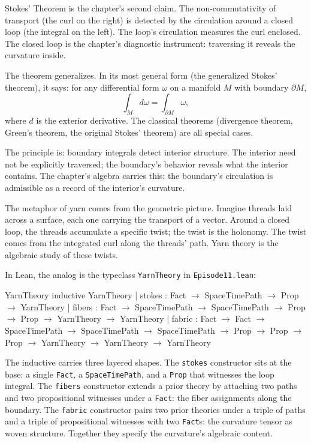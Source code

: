 Stokes' Theorem is the chapter's second claim. The non-commutativity
of transport (the curl on the right) is detected by the
circulation around a closed loop (the integral on the left). The
loop's circulation measures the curl enclosed. The closed loop is
the chapter's diagnostic instrument: traversing it reveals the
curvature inside.

The theorem generalizes. In its most general form (the generalized
Stokes' theorem), it says: for any differential form $\omega$
on a manifold $M$ with boundary $\partial M$,
\[
\int_M d\omega = \int_{\partial M} \omega,
\]
where $d$ is the exterior derivative. The classical theorems
(divergence theorem, Green's theorem, the original Stokes'
theorem) are all special cases.

The principle is: boundary integrals detect interior structure.
The interior need not be explicitly traversed; the boundary's
behavior reveals what the interior contains. The chapter's
algebra carries this: the boundary's circulation is admissible
as a record of the interior's curvature.

The metaphor of yarn comes from the geometric picture. Imagine
threads laid across a surface, each one carrying the transport
of a vector. Around a closed loop, the threads accumulate a
specific twist; the twist is the holonomy. The twist comes from
the integrated curl along the threads' path. Yarn theory is the
algebraic study of these twists.

In Lean, the analog is the typeclass \texttt{YarnTheory} in
\texttt{Episode11.lean}:

\begin{leanexcerpt}{YarnTheory}
inductive YarnTheory
  | stokes : Fact $\to$ SpaceTimePath $\to$ Prop $\to$ YarnTheory
  | fibers : Fact $\to$ SpaceTimePath $\to$ SpaceTimePath
           $\to$ Prop $\to$ Prop $\to$ YarnTheory $\to$ YarnTheory
  | fabric : Fact $\to$ Fact $\to$ SpaceTimePath $\to$ SpaceTimePath
           $\to$ SpaceTimePath $\to$ Prop $\to$ Prop $\to$ Prop
           $\to$ YarnTheory $\to$ YarnTheory $\to$ YarnTheory
\end{leanexcerpt}

The inductive carries three layered shapes. The \texttt{stokes}
constructor sits at the base: a single \texttt{Fact}, a
\texttt{SpaceTimePath}, and a \texttt{Prop} that witnesses the
loop integral. The \texttt{fibers} constructor extends a prior
theory by attaching two paths and two propositional witnesses
under a \texttt{Fact}: the fiber assignments along the boundary.
The \texttt{fabric} constructor pairs two prior theories under a
triple of paths and a triple of propositional witnesses with two
\texttt{Fact}s: the curvature tensor as woven structure. Together
they specify the curvature's algebraic content.


